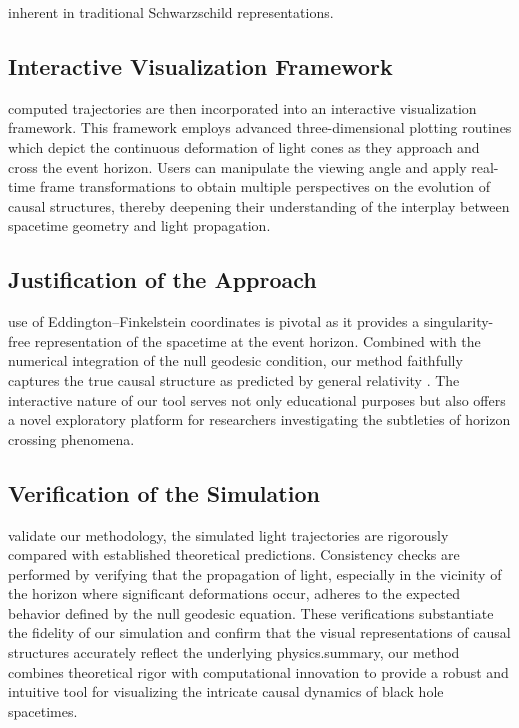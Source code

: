 \documentclass{article}
\begin{document}
inherent in traditional Schwarzschild representations.\n\n\subsection{Interactive Visualization Framework}\nThe computed trajectories are then incorporated into an interactive visualization framework. This framework employs advanced three-dimensional plotting routines which depict the continuous deformation of light cones as they approach and cross the event horizon. Users can manipulate the viewing angle and apply real-time frame transformations to obtain multiple perspectives on the evolution of causal structures, thereby deepening their understanding of the interplay between spacetime geometry and light propagation.\n\n\subsection{Justification of the Approach}\nThe use of Eddington--Finkelstein coordinates is pivotal as it provides a singularity-free representation of the spacetime at the event horizon. Combined with the numerical integration of the null geodesic condition, our method faithfully captures the true causal structure as predicted by general relativity \cite{ref1, ref2}. The interactive nature of our tool serves not only educational purposes but also offers a novel exploratory platform for researchers investigating the subtleties of horizon crossing phenomena.\n\n\subsection{Verification of the Simulation}\nTo validate our methodology, the simulated light trajectories are rigorously compared with established theoretical predictions. Consistency checks are performed by verifying that the propagation of light, especially in the vicinity of the horizon where significant deformations occur, adheres to the expected behavior defined by the null geodesic equation. These verifications substantiate the fidelity of our simulation and confirm that the visual representations of causal structures accurately reflect the underlying physics.\n\nIn summary, our method combines theoretical rigor with computational innovation to provide a robust and intuitive tool for visualizing the intricate causal dynamics of black hole spacetimes.
\end{document}
